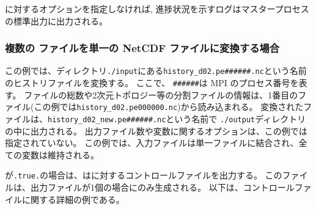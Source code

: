 に対するオプションを指定しなければ,
進捗状況を示すログはマスタープロセスの標準出力に出力される。

\subsubsection{複数の \scalenetcdf ファイルを単一の NetCDF ファイルに変換する場合}


この例では、ディレクトリ\verb|./input|にある\verb|history_d02.pe######.nc|という名前のヒストリファイルを変換する。
ここで、 \verb|######|は MPI のプロセス番号を表す。
ファイルの総数や2次元トポロジー等の分割ファイルの情報は、1番目のファイル(この例では\verb|history_d02.pe000000.nc|)から読み込まれる。
変換されたファイルは、\verb|history_d02_new.pe######.nc|という名前で \verb|./output|ディレクトリの中に出力される。
出力ファイル数や変数に関するオプションは、この例では指定されていない。
この例では、入力ファイルは単一ファイルに結合され、全ての変数は維持される。

が\verb|.true.|の場合は、\sno は{\grads}に対するコントロールファイルを出力する。
このファイルは、出力ファイルが1個の場合にのみ生成される。
以下は、コントロールファイルに関する詳細の例である。

